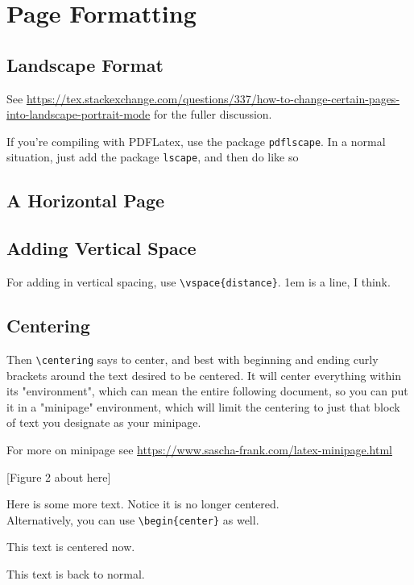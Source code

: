 \section{Page Formatting}\label{sec:page-formatting}

\subsection{Landscape Format}
See \url{https://tex.stackexchange.com/questions/337/how-to-change-certain-pages-into-landscape-portrait-mode} for the fuller discussion.

If you're compiling with PDFLatex, use the package \verb+pdflscape+. In a normal situation, just add the package \verb+lscape+, and then do like so

\begin{landscape}


\section{A Horizontal Page}

\end{landscape}

\subsection{Adding Vertical Space}
For adding in vertical spacing, use \verb+\vspace{distance}+. 1em is a line, I think.

\subsection{Centering}
Then \verb+\centering+ says to center, and best with beginning and ending curly brackets around the text desired to be centered. It will center everything within its "environment", which can mean the entire following document, so you can put it in a "minipage" environment, which will limit the centering to just that block of text you designate as your minipage.

For more on minipage see \url{https://www.sascha-frank.com/latex-minipage.html}

\noindent
\begin{minipage}{\textwidth} %
\centering
\vspace{1em}
[Figure 2 about here]
\vspace{1em}

\end{minipage}

\noindent
Here is some more text. Notice it is no longer centered.\\


Alternatively, you can use \verb+\begin{center}+ as well. 

\begin{center}
\vspace{1em}
This text is centered now.
\vspace{1em}
\end{center}

\noindent
This text is back to normal. 
